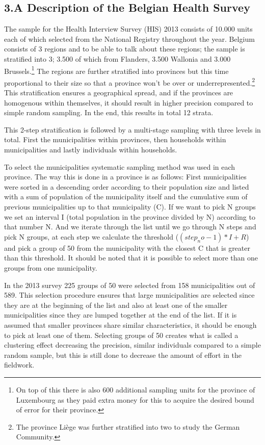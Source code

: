 \subsection*{3.A Description of the Belgian Health Survey}
The sample for the Health Interview Survey (HIS) 2013 consists of 10.000 units each of which selected from the National Registry throughout the year. Belgium consists of 3 regions and to be able to talk about these regions; the sample is stratified into 3; 3.500 of which from Flanders, 3.500 Wallonia and 3.000 Brussels.\footnote{On top of this there is also 600 additional sampling units for the province of Luxembourg as they paid extra money for this to acquire the desired bound of error for their province.} The regions are further stratified into provinces but this time proportional to their size so that a province won't be over or underrepresented.\footnote{The province Liège was further stratified into two to study the German Community.} This stratification ensures a geographical spread, and if the provinces are homogenous within themselves, it should result in higher precision compared to simple random sampling. In the end, this results in total 12 strata.

This 2-step stratification is followed by a multi-stage sampling with three levels in total. First the municipalities within provinces, then households within municipalities and lastly individuals within households. 

To select the municipalities systematic sampling method was used in each province. The way this is done in a province is as follows: First municipalities were sorted in a descending order according to their population size and listed with a sum of population of the municipality itself and the cumulative sum of previous municipalities up to that municipality (C). If we want to pick N groups we set an interval I (total population in the province divided by N) according to that number N. And we iterate through the list until we go through N steps and pick N groups, at each step we calculate the threshold ($(step_no-1)*I + R$) and pick a group of 50 from the municipality with the closest C that is greater than this threshold. It should be noted that it is possible to select more than one groups from one municipality.

In the 2013 survey 225 groups of 50 were selected from 158 municipalities out of 589. This selection procedure ensures that large municipalities are selected since they are at the beginning of the list and also at least one of the smaller municipalities since they are lumped together at the end of the list. If it is assumed that smaller provinces share similar characteristics, it should be enough to pick at least one of them. Selecting groups of 50  creates what is called a clustering effect decreasing the precision, similar individuals compared to a simple random sample, but this is still done to decrease the amount of effort in the fieldwork.

